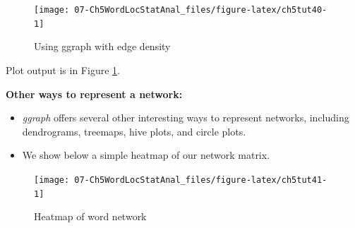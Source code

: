 \documentclass[
]{article}
\newenvironment{Shaded}{\begin{snugshade}}{\end{snugshade}}
\newcommand{\AttributeTok}[1]{\textcolor[rgb]{0.13,0.29,0.53}{#1}}
\newcommand{\ConstantTok}[1]{\textcolor[rgb]{0.56,0.35,0.01}{#1}}
\newcommand{\DecValTok}[1]{\textcolor[rgb]{0.00,0.00,0.81}{#1}}
\newcommand{\FunctionTok}[1]{\textcolor[rgb]{0.13,0.29,0.53}{\textbf{#1}}}
\newcommand{\NormalTok}[1]{#1}
\newcommand{\OtherTok}[1]{\textcolor[rgb]{0.56,0.35,0.01}{#1}}
\newcommand{\SpecialCharTok}[1]{\textcolor[rgb]{0.81,0.36,0.00}{\textbf{#1}}}
\newcommand{\StringTok}[1]{\textcolor[rgb]{0.31,0.60,0.02}{#1}}
\providecommand{\tightlist}{%
  \setlength{\itemsep}{0pt}\setlength{\parskip}{0pt}}
\begin{document}
\begin{figure}

{\centering \texttt{[image: 07-Ch5WordLocStatAnal\_files/figure-latex/ch5tut40-1]} 

}

\caption{Using ggraph with edge density}\label{fig:ch5tut40}
\end{figure}

Plot output is in Figure \ref{fig:ch5tut40}.

\textbf{Other ways to represent a network:}

\begin{itemize}
\tightlist
\item
  \emph{ggraph} offers several other interesting ways to represent networks, including dendrograms, treemaps, hive plots, and circle plots.
\item
  We show below a simple heatmap of our network matrix.
\end{itemize}

\begin{Shaded}
\end{Shaded}

\begin{figure}

{\centering \texttt{[image: 07-Ch5WordLocStatAnal\_files/figure-latex/ch5tut41-1]} 

}

\caption{Heatmap of word network}\label{fig:ch5tut41}
\end{figure}
\end{document}
